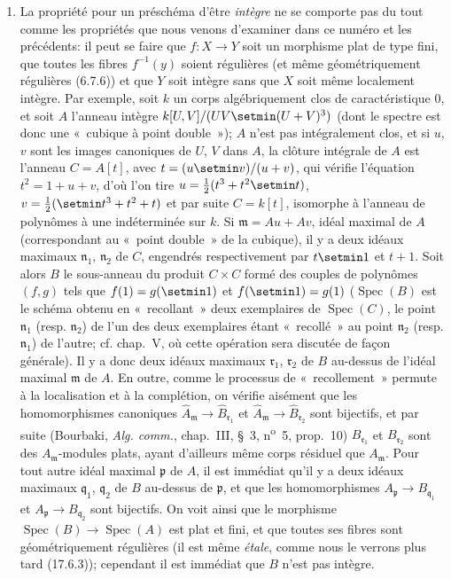 \begin{remarks}[6.5.5]
\begin{enumerate}
\item[(ii)] La propriété pour un préschéma d'être \emph{intègre} ne se
comporte pas du tout comme les propriétés que nous venons d'examiner dans
ce numéro et les précédents: il peut se faire que
$f:X\to Y$ soit un morphisme plat de type fini, que toutes les fibres
$f^{-1}(y)$ soient régulières (et même géométriquement régulières (6.7.6))
et que $Y$ soit intègre sans que $X$ soit même localement intègre.
Par exemple, soit $k$ un corps algébriquement clos de caractéristique $0$,
et soit $A$ l'anneau intègre $k[U,V]/(UV\setmin(U+V)^3)$ (dont le spectre est
donc une «~cubique à point double~»); $A$ n'est pas intégralement clos,
et si $u$, $v$ sont les images canoniques de $U$, $V$ dans $A$, la clôture
intégrale de $A$ est l'anneau $C=A[t]$, avec $t=(u\setmin v)/(u+v)$, qui vérifie l'équation $t^2=1+u+v$, d'où l'on tire
$u=\frac{1}{2}(t^3+t^2\setmin t)$,
$v=\frac{1}{2}(\setmin t^3+t^2+t)$
et par suite $C=k[t]$, isomorphe à l'anneau de polynômes à une
indéterminée sur $k$. Si $\mathfrak m=Au+Av$, idéal maximal de $A$
(correspondant au «~point double~» de la cubique), il y a deux idéaux
maximaux $\mathfrak n_1$, $\mathfrak n_2$ de $C$, engendrés respectivement
par $t\setmin 1$ et $t+1$. Soit alors $B$ le sous-anneau du produit $C\times C$
formé des couples de polynômes $(f,g)$ tels que
$f(1)=g(\setmin 1)$ et $f(\setmin 1)=g(1)$
($\operatorname{Spec}(B)$ est le schéma obtenu en «~recollant~» deux
exemplaires de $\operatorname{Spec}(C)$, le point $\mathfrak n_1$
(resp. $\mathfrak n_2$) de l'un des deux exemplaires étant «~recollé~»
au point $\mathfrak n_2$ (resp. $\mathfrak n_1$) de l'autre; cf. chap.~V,
où cette opération sera discutée de façon générale). Il y a donc deux
idéaux maximaux $\mathfrak r_1$, $\mathfrak r_2$ de $B$ au-dessus de
l'idéal maximal $\mathfrak m$ de $A$. En outre, comme le processus de
«~recollement~» permute à la localisation et à la complétion, on vérifie
aisément que les homomorphismes canoniques
$\widehat A_{\mathfrak m}\to\widehat B_{\mathfrak r_1}$ et
$\widehat A_{\mathfrak m}\to\widehat B_{\mathfrak r_2}$
sont bijectifs, et par suite (Bourbaki, \emph{Alg. comm.}, chap.~III,
\S~3, n\textsuperscript{o}~5, prop.~10) $B_{\mathfrak r_1}$ et
$B_{\mathfrak r_2}$ sont des $A_{\mathfrak m}$-modules plats, ayant
d'ailleurs même corps résiduel que $A_{\mathfrak m}$. Pour tout autre idéal
maximal $\mathfrak p$ de $A$, il est immédiat qu'il y a deux idéaux
maximaux $\mathfrak q_1$, $\mathfrak q_2$ de $B$ au-dessus de $\mathfrak p$,
et que les homomorphismes
$A_{\mathfrak p}\to B_{\mathfrak q_1}$ et
$A_{\mathfrak p}\to B_{\mathfrak q_2}$ sont bijectifs. On voit ainsi que
le morphisme $\operatorname{Spec}(B)\to\operatorname{Spec}(A)$ est plat
et fini, et que toutes ses fibres sont géométriquement régulières (il est
même \emph{\'etale}, comme nous le verrons plus tard (17.6.3)); cependant
il est immédiat que $B$ n'est pas intègre.
\end{enumerate}
\end{remarks}

